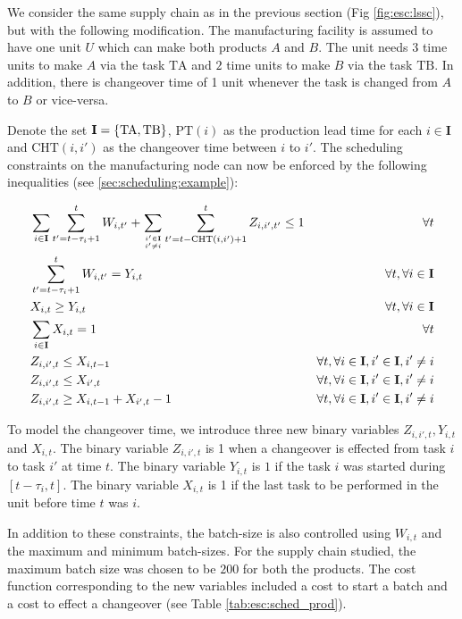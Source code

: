 We consider the same supply chain as in the previous section (Fig
\ref{fig:esc:lssc}), but with the following modification. The
manufacturing facility is assumed to have one unit $U$ which can
 make both products $A$ and $B$. The unit needs $3$ time units to make
$A$ via the task $\text{TA}$ and $2$ time units to make $B$ via the task
$\text{TB}$. In addition, there is changeover time of 1 unit whenever the
task is changed from $A$ to $B$ or vice-versa. 

Denote the set $\mathbf{I} = \left\lbrace \text{TA},\text{TB} \right\rbrace$,  $\text{PT}(i)$ as the
production lead time for each $i \in \mathbf{I}$ and $\text{CHT}(i,i')$ as
the changeover time between $i$ to $i'$. The scheduling constraints on
the manufacturing node can now be enforced by the following
inequalities (see \ref{sec:scheduling:example}):

\begin{alignat}{2}
&\sum_{i\in \mathbf{I}}\sum_{t' = t-\tau_i+1}^{t}W_{i,t'}+\sum_{i' \in
 \mathbf{I} \atop i' \neq i}\sum_{t'=t-\text{CHT}(i,i')+1}^{t}
Z_{i,i',t'} \leq 1 & \forall t \nonumber \\ 
&\sum_{t' = t-\tau_i+1}^{t} W_{i,t'} = Y_{i,t} & \forall t, \forall i
\in \mathbf{I} \nonumber\\
&X_{i,t} \geq Y_{i,t} & \forall t, \forall i \in \mathbf{I} \nonumber\\
&\sum_{i \in \mathbf{I}}X_{i,t} = 1 & \forall
t  \label{eq:esc:assign}\\ 
&Z_{i,i',t} \leq X_{i,t-1} &\forall t, \forall i \in \mathbf{I}, i' \in
\mathbf{I}, i' \neq i \nonumber\\
&Z_{i,i',t} \leq X_{i',t} &\forall t, \forall i \in \mathbf{I}, i' \in
\mathbf{I}, i'\neq i \nonumber \\
&Z_{i,i',t} \geq X_{i,t-1}+X_{i',t}-1 &\forall t, \forall i \in \mathbf{I}, i' \in
\mathbf{I}, i' \neq i \nonumber
\end{alignat}

To model the changeover time, we introduce three new binary variables $Z_{i,i',t},Y_{i,t}$ and
$X_{i,t}$. The binary variable $Z_{i,i',t}$ is 1 when a changeover is
effected from task $i$ to task $i'$ at time $t$. The binary variable
$Y_{i,t}$ is $1$ if the task $i$ was started during $[t-\tau_i,t]$. The
binary variable $X_{i,t}$ is 1 if the last task to be performed in the
unit before time $t$ was $i$.

In addition to these constraints, the batch-size is also controlled using
$W_{i,t}$ and the maximum and minimum batch-sizes. For the supply chain
studied, the maximum batch size was chosen to be $200$ for both the
products. The cost function corresponding to the new variables
included a cost to start a batch and a cost to effect a changeover
(see Table \ref{tab:esc:sched_prod}).

